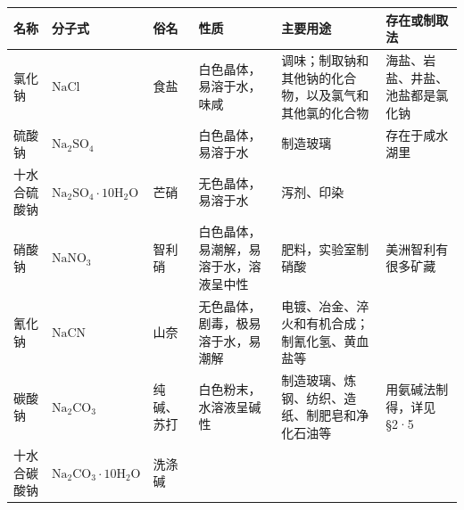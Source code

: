 {\def\LTcaptype{none}%
\scriptsize\setlength{\tabcolsep}{2.5pt}%
\begin{longtable}[]{@{}
  >{\raggedright\arraybackslash}p{}
  >{\raggedright\arraybackslash}p{}
  >{\raggedright\arraybackslash}p{}
  >{\raggedright\arraybackslash}p{}
  >{\raggedright\arraybackslash}p{}
  >{\raggedright\arraybackslash}p{}@{}}
\toprule\noalign{}
\begin{minipage}[b]{\linewidth}\raggedright
名称
\end{minipage} & \begin{minipage}[b]{\linewidth}\raggedright
分子式
\end{minipage} & \begin{minipage}[b]{\linewidth}\raggedright
俗名
\end{minipage} & \begin{minipage}[b]{\linewidth}\raggedright
性质
\end{minipage} & \begin{minipage}[b]{\linewidth}\raggedright
主要用途
\end{minipage} & \begin{minipage}[b]{\linewidth}\raggedright
存在或制取法
\end{minipage} \\
\midrule\noalign{}
\endhead
\bottomrule\noalign{}
\endlastfoot
氯化钠 & \(\mathrm{NaCl}\) & 食盐 & 白色晶体，易溶于水，味咸 &
调味；制取钠和其他钠的化合物，以及氯气和其他氯的化合物 &
海盐、岩盐、井盐、池盐都是氯化钠 \\
硫酸钠 & \(\mathrm{Na_2SO_4}\) & & 白色晶体，易溶于水 & 制造玻璃 &
存在于咸水湖里 \\
十水合硫酸钠 & \(\mathrm{Na_2SO_4\cdot10H_2O}\) & 芒硝 &
无色晶体，易溶于水 & 泻剂、印染 & \\
硝酸钠 & \(\mathrm{NaNO_3}\) & 智利硝 &
白色晶体，易潮解，易溶于水，溶液呈中性 & 肥料，实验室制硝酸 &
美洲智利有很多矿藏 \\
氰化钠 & \(\mathrm{NaCN}\) & 山奈 & 无色晶体，剧毒，极易溶于水，易潮解 &
电镀、冶金、淬火和有机合成；制氰化氢、黄血盐等 & \\
碳酸钠 & \(\mathrm{Na_2CO_3}\) & 纯碱、苏打 & 白色粉末，水溶液呈碱性 &
制造玻璃、炼钢、纺织、造纸、制肥皂和净化石油等 &
用氨碱法制得，详见§2·5 \\
十水合碳酸钠 & \(\mathrm{Na_2CO_3\cdot10H_2O}\) & 洗涤碱 &

\end{longtable}}
